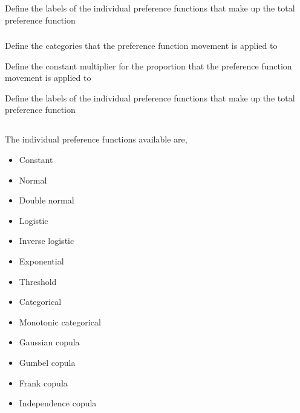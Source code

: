 {Define the labels of the individual  preference functions that make up the total preference function}

\subsubsection[Multi-threaded preference movement]{}

 {Define the categories that the preference function movement is applied to}

 {Define the constant multiplier for the proportion that the preference function movement is applied to}

 {Define the labels of the individual  preference functions that make up the total preference function}

\subsection{}

The individual preference functions available are,

\begin{itemize}
	\item Constant
	\item Normal
	\item Double normal
	\item Logistic
	\item Inverse logistic
	\item Exponential
	\item Threshold
	\item Categorical
	\item Monotonic categorical
	\item Gaussian copula
	\item Gumbel copula
	\item Frank copula
	\item Independence copula
\end{itemize}

